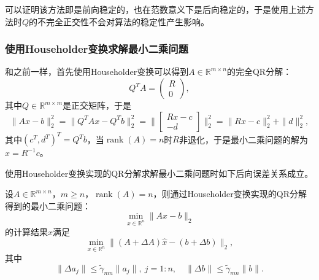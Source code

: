\documentclass[a4paper,10pt]{ctexart}
\begin{document}
可以证明该方法即是前向稳定的，也在范数意义下是后向稳定的，于是使用上述方法时$ Q $的不完全正交性不会对算法的稳定性产生影响。

\subsubsection{使用Householder变换求解最小二乘问题}
和之前一样，首先使用Householder变换可以得到$ A\in \mathbb{R}^{m\times n} $的完全QR分解：
\[
    Q^T A = 
    \begin{pmatrix} 
        R \\ 0
    \end{pmatrix},
\]
其中$ Q\in \mathbb{R}^{m\times m} $是正交矩阵，于是
\[
    \| Ax - b \|_2^2 = \| Q^T Ax - Q^T b \|_2^2 = 
    \| \begin{bmatrix} 
        Rx-c \\ -d
    \end{bmatrix} \|_2^2 = \| Rx - c \|_2^2 + \| d \|_2^2,
\]
其中$ (c^T,d^T)^T = Q^T b $，当$ \operatorname{rank}(A)=n $时$ R $非退化，于是最小二乘问题的解为$ x = R^{-1}c $。


使用Householder变换实现的QR分解求解最小二乘问题时如下后向误差关系成立。
\begin{theorem}
    设$ A\in \mathbb{R}^{m\times n} $，$ m\geqslant n $，$ \operatorname{rank}(A)=n $，则通过Householder变换实现的QR分解得到的最小二乘问题：
    \begin{equation}
        \min_{x\in \mathbb{R}^n} \| Ax - b \|_2
    \end{equation}
    的计算结果$ \hat{x} $满足
    \begin{equation}
        \min_{x\in \mathbb{R}^n} \| (A+\Delta A)\hat{x} - (b+\Delta b) \|_2,
    \end{equation}
    其中
    \[
        \| \Delta a_j \| \leqslant \tilde{\gamma}_{mn} \| a_j \|,\ j=1:n,\quad \| \Delta b \| \leqslant \tilde{\gamma}_{mn} \| b \|.
    \]
\end{theorem}
\end{document}

